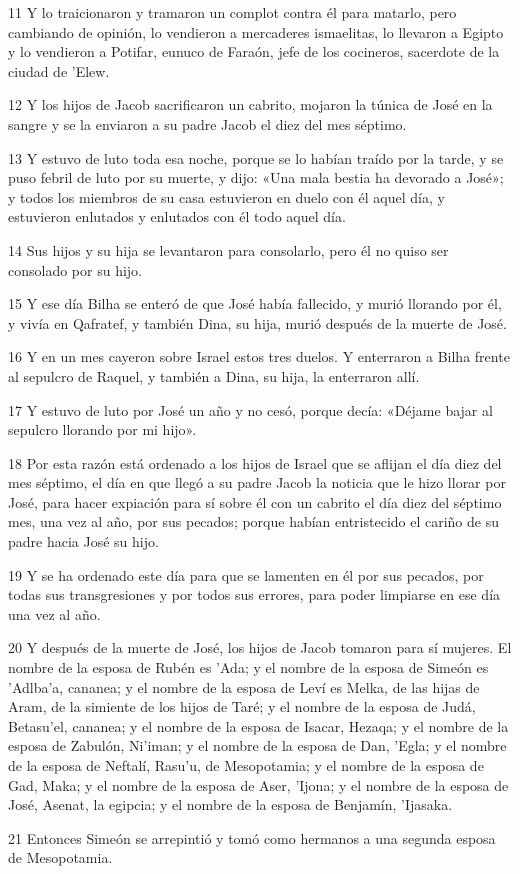 \par 11 Y lo traicionaron y tramaron un complot contra él para matarlo, pero cambiando de opinión, lo vendieron a mercaderes ismaelitas, lo llevaron a Egipto y lo vendieron a Potifar, eunuco de Faraón, jefe de los cocineros, sacerdote de la ciudad de 'Elew.
\par 12 Y los hijos de Jacob sacrificaron un cabrito, mojaron la túnica de José en la sangre y se la enviaron a su padre Jacob el diez del mes séptimo.
\par 13 Y estuvo de luto toda esa noche, porque se lo habían traído por la tarde, y se puso febril de luto por su muerte, y dijo: «Una mala bestia ha devorado a José»; y todos los miembros de su casa estuvieron en duelo con él aquel día, y estuvieron enlutados y enlutados con él todo aquel día.
\par 14 Sus hijos y su hija se levantaron para consolarlo, pero él no quiso ser consolado por su hijo.
\par 15 Y ese día Bilha se enteró de que José había fallecido, y murió llorando por él, y vivía en Qafratef, y también Dina, su hija, murió después de la muerte de José.
\par 16 Y en un mes cayeron sobre Israel estos tres duelos. Y enterraron a Bilha frente al sepulcro de Raquel, y también a Dina, su hija, la enterraron allí.
\par 17 Y estuvo de luto por José un año y no cesó, porque decía: «Déjame bajar al sepulcro llorando por mi hijo».
\par 18 Por esta razón está ordenado a los hijos de Israel que se aflijan el día diez del mes séptimo, el día en que llegó a su padre Jacob la noticia que le hizo llorar por José, para hacer expiación para sí sobre él con un cabrito el día diez del séptimo mes, una vez al año, por sus pecados; porque habían entristecido el cariño de su padre hacia José su hijo.
\par 19 Y se ha ordenado este día para que se lamenten en él por sus pecados, por todas sus transgresiones y por todos sus errores, para poder limpiarse en ese día una vez al año.
\par 20 Y después de la muerte de José, los hijos de Jacob tomaron para sí mujeres. El nombre de la esposa de Rubén es 'Ada; y el nombre de la esposa de Simeón es 'Adlba'a, cananea; y el nombre de la esposa de Leví es Melka, de las hijas de Aram, de la simiente de los hijos de Taré; y el nombre de la esposa de Judá, Betasu'el, cananea; y el nombre de la esposa de Isacar, Hezaqa; y el nombre de la esposa de Zabulón, Ni'iman; y el nombre de la esposa de Dan, 'Egla; y el nombre de la esposa de Neftalí, Rasu'u, de Mesopotamia; y el nombre de la esposa de Gad, Maka; y el nombre de la esposa de Aser, 'Ijona; y el nombre de la esposa de José, Asenat, la egipcia; y el nombre de la esposa de Benjamín, 'Ijasaka.
\par 21 Entonces Simeón se arrepintió y tomó como hermanos a una segunda esposa de Mesopotamia.

